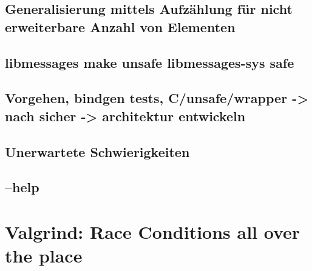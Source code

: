 	\subsection{Generalisierung mittels Aufzählung für nicht erweiterbare Anzahl von Elementen}
	
	\subsection{libmessages make unsafe libmessages-sys safe}
	
	\subsection{Vorgehen, bindgen tests, C/unsafe/wrapper -> nach sicher ->  architektur entwickeln}
	

	
	\subsection{Unerwartete Schwierigkeiten}
	
	
	
	
	
	\subsection{--help}



\section{Valgrind: Race Conditions all over the place}